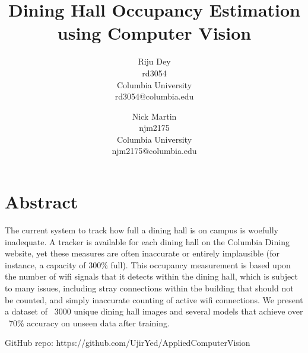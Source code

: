 \documentclass{article}
\title{Dining Hall Occupancy Estimation using Computer Vision}
\author{
  Riju Dey\\
  rd3054\\
  Columbia University\\
  rd3054@columbia.edu
  \and
  Nick Martin\\
  njm2175\\
  Columbia University\\
  njm2175@columbia.edu
}
\begin{document}
\maketitle

\section*{Abstract}
  The current system to track how full a dining hall is on campus is woefully inadequate. A tracker is available for each dining hall on the Columbia Dining website, yet these measures are often inaccurate or entirely implausible (for instance, a capacity of 300\% full). This occupancy measurement is based upon the number of wifi signals that it detects within the dining hall, which is subject to many issues, including stray connections within the building that should not be counted, and simply inaccurate counting of active wifi connections. We present a dataset of ~3000 unique dining hall images and several models that achieve over ~70\% accuracy on unseen data after training.

GitHub repo: https://github.com/UjirYed/AppliedComputerVision
\end{document}
